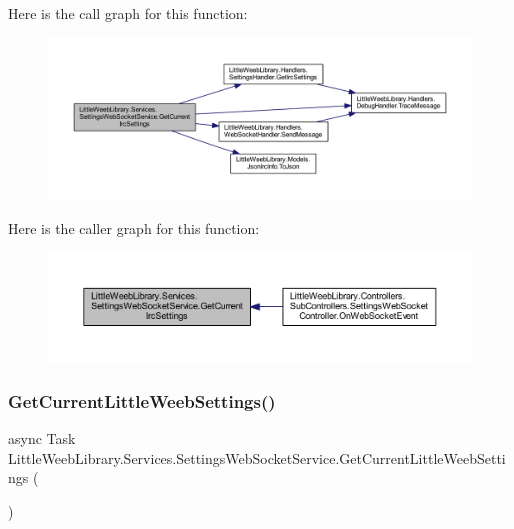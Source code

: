 Here is the call graph for this function\+:\nopagebreak
\begin{figure}[H]
\begin{center}
\leavevmode
\includegraphics[width=350pt]{class_little_weeb_library_1_1_services_1_1_settings_web_socket_service_aaa29fbcae1268174d436730a58afadca_cgraph}
\end{center}
\end{figure}
Here is the caller graph for this function\+:\nopagebreak
\begin{figure}[H]
\begin{center}
\leavevmode
\includegraphics[width=350pt]{class_little_weeb_library_1_1_services_1_1_settings_web_socket_service_aaa29fbcae1268174d436730a58afadca_icgraph}
\end{center}
\end{figure}
\mbox{\label{class_little_weeb_library_1_1_services_1_1_settings_web_socket_service_a50cbfe4ba270c9e84b6b7b427a1b9ce0}} 
\subsubsection{\texorpdfstring{Get\+Current\+Little\+Weeb\+Settings()}{GetCurrentLittleWeebSettings()}}
{\footnotesize\ttfamily async Task Little\+Weeb\+Library.\+Services.\+Settings\+Web\+Socket\+Service.\+Get\+Current\+Little\+Weeb\+Settings (\begin{DoxyParamCaption}{ }\end{DoxyParamCaption})}



